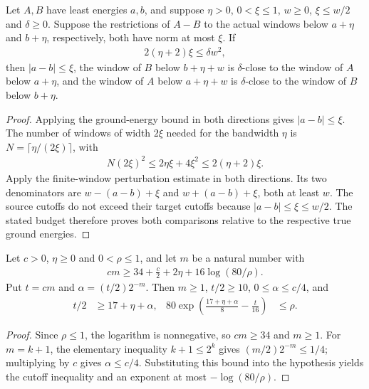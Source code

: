 \begin{lemma}
    \label{thm:spectral_residual_directed_windows}
    \leanok
    Let $A,B$ have least energies $a,b$, and suppose $\eta>0$,
    $0<\xi\le1$, $w\ge0$, $\xi\le w/2$ and $\delta\ge0$. Suppose the
    restrictions of $A-B$ to the actual windows below $a+\eta$ and
    $b+\eta$, respectively, both have norm at most $\xi$. If
    \begin{align*}
        2(\eta+2)\xi\le\delta w^2,
    \end{align*}
    then $|a-b|\le\xi$, the window of $B$ below $b+\eta+w$ is
    $\delta$-close to the window of $A$ below $a+\eta$, and the window
    of $A$ below $a+\eta+w$ is $\delta$-close to the window of $B$
    below $b+\eta$.
\end{lemma}
\begin{proof}\leanok
    Applying the ground-energy bound in both directions gives
    $|a-b|\le\xi$. The number of windows of width $2\xi$ needed for
    the bandwidth $\eta$ is $N=\lceil\eta/(2\xi)\rceil$, with
    \begin{align*}
        N(2\xi)^2\le2\eta\xi+4\xi^2\le2(\eta+2)\xi.
    \end{align*}
    Apply the finite-window perturbation estimate in both directions.
    Its two denominators are $w-(a-b)+\xi$ and $w+(a-b)+\xi$, both at
    least $w$. The source cutoffs do not exceed their target cutoffs
    because $|a-b|\le\xi\le w/2$. The stated budget therefore proves
    both comparisons relative to the respective true ground energies.
\end{proof}

\begin{lemma}
    \label{thm:soft_truncation_scaled_order_bounds}
    \leanok
    Let $c>0$, $\eta\ge0$ and $0<\rho\le1$, and let $m$ be a natural
    number with
    \begin{align*}
        cm\ge34+\frac c2+2\eta+16\log(80/\rho).
    \end{align*}
    Put $t=cm$ and $\alpha=(t/2)2^{-m}$. Then $m\ge1$, $t/2\ge10$,
    $0\le\alpha\le c/4$, and
    \begin{align*}
        t/2                                                     & \ge17+\eta+\alpha, &
        80\exp\left(\frac{17+\eta+\alpha}{8}-\frac t{16}\right) & \le\rho.
    \end{align*}
\end{lemma}
\begin{proof}\leanok
    Since $\rho\le1$, the logarithm is nonnegative, so $cm\ge34$ and
    $m\ge1$. For $m=k+1$, the elementary inequality $k+1\le2^k$ gives
    $(m/2)2^{-m}\le1/4$; multiplying by $c$ gives $\alpha\le c/4$.
    Substituting this bound into the hypothesis yields the cutoff
    inequality and an exponent at most $-\log(80/\rho)$.
\end{proof}

